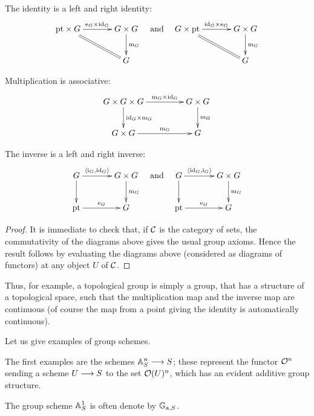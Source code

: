 \begin{2   CONTRAVARIANT FUNCTORS}
\begin{2.2 Group objects}
\begin{proposition}
\begin{enumeratei}

\item The identity is a left and right identity:
   \[
   \xymatrix@C+10pt{
   {}\pt \times G \ar[r]^{\iden_G \times \id_G}\ar@{=}[rd]&
			G \times G\ar[d]^{\mul_G}\\
			&G
   }
\quad\text{and}\quad
   \xymatrix@C+10pt{
   G \times \pt \ar[r]^{\id_G \times\iden_G}\ar@{=}[rd]&
			G \times G\ar[d]^{\mul_G}\\
			&G
   }
   \]

\item Multiplication is associative:
   \[
   \xymatrix@C+20pt{
   G \times G \times G\ar[r]^-{\mul_G \times \id_G}
			\ar[d]^{\id_G \times \mul_G} &
			G \times G\ar[d]^{\mul_G}\\
   G \times G\ar[r]^-{\mul_G} &
			G
   }
   \]

\item The inverse is a left and right inverse:
   \[
   \xymatrix@C+10pt{
   G\ar[r]^-{\generate{\inv_G,\id_G}}\ar[d] &
			G \times G\ar[d]^{\mul_G}\\
			{}\pt \ar[r]^-{\iden_G}&
   G}
   \quad\text{and}\quad
   \xymatrix@C+10pt{
   G\ar[r]^-{\generate{\id_G, \inv_G}}\ar[d] &
			G \times G\ar[d]^{\mul_G}\\
			{}\pt \ar[r]^-{\iden_G}&
   G}
   \]
\end{enumeratei}
\end{proposition}

\begin{proof}
It is immediate to check that, if $\cC$ is the category of sets, the commutativity of the diagrams above gives the usual group axioms. Hence the result follows by evaluating the diagrams above (considered as diagrams of functors) at any object $U$ of $\cC$.
\end{proof}

Thus, for example, a topological group is simply a group, that has a structure of a topological space, such that the multiplication map and the inverse map are continuous (of course the map from a point giving the identity is automatically continuous).

Let us give examples of group schemes.

The first examples are the schemes $\AA^n_S \arr S$; these represent the functor $\cO^n $ sending a scheme $U \arr S$ to the set $\cO(U)^n$, which has an evident additive group structure. 

The group scheme $\AA^1_S$ is often denote by $\GG_{\rma, S}$.


\end{2.2 Group objects}
\end{2   CONTRAVARIANT FUNCTORS}
